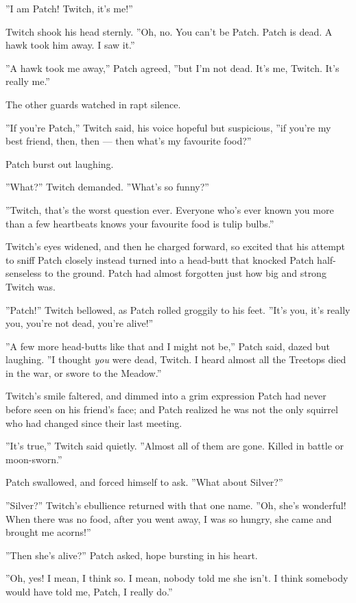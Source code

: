 \documentclass[12pt]{book}
\begin{document}
''I am Patch! Twitch, it's me!''

Twitch shook his head sternly. ''Oh, no. You can't be Patch. Patch is
dead. A hawk took him away. I saw it.''

''A hawk took me away,'' Patch agreed, ''but I'm not dead. It's me,
Twitch. It's really me.''

The other guards watched in rapt silence.

''If you're Patch,'' Twitch said, his voice hopeful but suspicious,
''if you're my best friend, then, then --- then what's my favourite
food?''

Patch burst out laughing.

''What?'' Twitch demanded. ''What's so funny?''

''Twitch, that's the worst question ever. Everyone who's ever known
you more than a few heartbeats knows your favourite food is tulip
bulbs.''

Twitch's eyes widened, and then he charged forward, so excited that
his attempt to sniff Patch closely instead turned into a head-butt
that knocked Patch half-senseless to the ground. Patch had almost
forgotten just how big and strong Twitch was.

''Patch!'' Twitch bellowed, as Patch rolled groggily to his
feet. ''It's you, it's really you, you're not dead, you're alive!''

''A few more head-butts like that and I might not be,'' Patch said,
dazed but laughing. ''I thought \textit{you} were dead, Twitch. I
heard almost all the Treetops died in the war, or swore to the
Meadow.''

Twitch's smile faltered, and dimmed into a grim expression Patch had
never before seen on his friend's face; and Patch realized he was not
the only squirrel who had changed since their last meeting.

''It's true,'' Twitch said quietly. ''Almost all of them are
gone. Killed in battle or moon-sworn.''

Patch swallowed, and forced himself to ask. ''What about Silver?''

''Silver?'' Twitch's ebullience returned with that one name. ''Oh,
she's wonderful! When there was no food, after you went away, I was so
hungry, she came and brought me acorns!''

''Then she's alive?'' Patch asked, hope bursting in his heart.

''Oh, yes! I mean, I think so. I mean, nobody told me she isn't. I
think somebody would have told me, Patch, I really do.''
\end{document}

